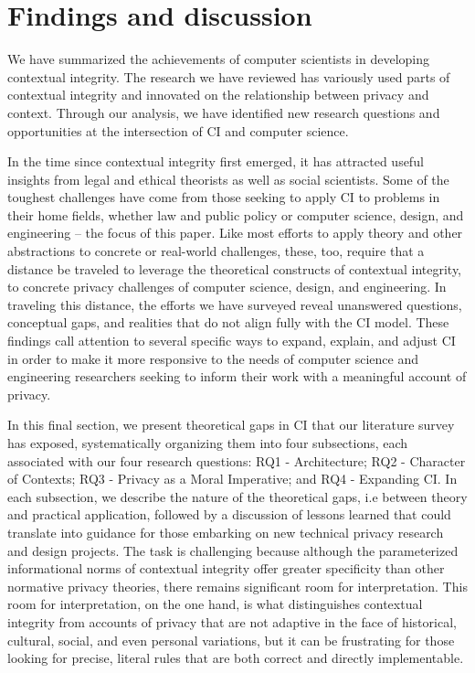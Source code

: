 \documentclass[../thesis.tex]{subfiles}
\begin{document}
\section{Findings and discussion}
\label{CI5}

We have summarized the achievements of
computer scientists in developing contextual integrity. The research we
have reviewed has variously used parts of contextual integrity and
innovated on the relationship between privacy and context. Through our
analysis, we have identified new research questions and opportunities
at the intersection of CI and computer science.

In the time since contextual integrity
first emerged, it has attracted useful insights from legal and ethical
theorists as well as social scientists. Some of the toughest challenges
have come from those seeking to apply CI to problems in their home
fields, whether law and public policy or computer science, design, and
engineering -- the focus of this paper. Like most efforts to apply
theory and other abstractions to concrete or real-world challenges,
these, too, require that a distance be traveled to leverage the
theoretical constructs of contextual integrity, to concrete privacy
challenges of computer science, design, and engineering. In traveling
this distance, the efforts we have surveyed reveal unanswered
questions, conceptual gaps, and realities that do not align fully with
the CI model. These findings call attention to several specific ways to
expand, explain, and adjust CI in order to make it more responsive to
the needs of computer science and engineering researchers seeking to
inform their work with a meaningful account of privacy. 

In this final section, we present
theoretical gaps in CI
that our literature survey has exposed,
systematically organizing them into four subsections, each associated
with our four research questions: RQ1 - Architecture; RQ2 - Character
of Contexts; RQ3 - Privacy as a Moral Imperative; and RQ4 - Expanding
CI. In each subsection, we describe the nature of the theoretical gaps,
i.e between theory and practical application, followed by a discussion
of lessons learned that could translate into guidance for those
embarking on new technical privacy research and design projects. The
task is challenging because although the parameterized informational
norms of contextual integrity offer greater specificity than other
normative privacy theories, there remains significant room for
interpretation. This room for interpretation, on the one hand, is what
distinguishes contextual integrity from accounts of privacy that are
not adaptive in the face of historical, cultural, social, and even
personal variations, but it can be frustrating for those looking for
precise, literal rules that are both correct and directly
implementable. 
\end{document}
